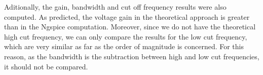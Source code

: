 \par Aditionally, the gain, bandwidth and cut off frequency results were also computed. As predicted, the voltage gain in the theoretical approach is greater than in the Ngspice computation. Moreover, since we do not have the theoretical high cut frequency, we can only compare the results for the low cut frequency, which are very similar as far as the order of magnitude is concerned. For this reason, as the bandwidth is the subtraction between high and low cut frequencies, it should not be compared.









